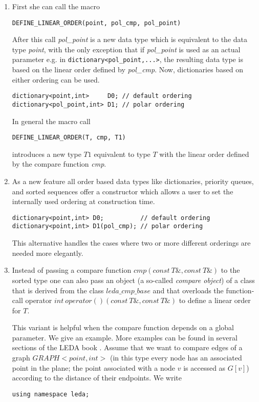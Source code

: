 \begin{enumerate}
\item First she can call the macro 
\begin{verbatim}
DEFINE_LINEAR_ORDER(point, pol_cmp, pol_point)
\end{verbatim}
After this call {\it pol\_point} is a new data type which is equivalent to the
data type {\it point}, with the only exception that if {\it pol\_point} is used
as an actual parameter e.g. in \texttt{dictionary<pol\_point,...>}, the
resulting data type is based on the linear order defined by {\it pol\_cmp}.
Now, dictionaries based on either ordering can be used.

\begin{verbatim}
dictionary<point,int>     D0; // default ordering
dictionary<pol_point,int> D1; // polar ordering
\end{verbatim}

In general the macro call
\begin{verbatim}
DEFINE_LINEAR_ORDER(T, cmp, T1)  
\end{verbatim}
introduces a new type $T1$ equivalent to type $T$ with the linear order defined
by the compare function {\it cmp}.

\item
As a new feature all order based data types like dictionaries, priority queues,
and sorted sequences offer a constructor which allows a user to set the
internally used ordering at construction time.
\begin{verbatim}
dictionary<point,int> D0;          // default ordering
dictionary<point,int> D1(pol_cmp); // polar ordering
\end{verbatim}
This alternative handles the cases where two or more different orderings
are needed more elegantly. 


\item Instead of passing a compare function 
$\mathit{cmp}(\mathit{const}\ T\&, \mathit{const}\ T\&)$ 
to the sorted type one can also pass an object (a so-called \emph{compare
object}) of a class that is derived from the class
$\mathit{leda{\_}cmp{\_}base}$ and that overloads the function-call operator
$\mathit{int}\ \mathit{operator}()(\mathit{const}\ T\&, \mathit{const}\ T\&)$
to define a linear order for $T$.

This variant is helpful when the compare function depends on a global
parameter. We give an example. More examples can be found in several sections
of the LEDA book \cite{LEDAbook}.  Assume that we want to compare edges of a
graph $\mathit{GRAPH}<\mathit{point},\mathit{int}>$ (in this type every node
has an associated point in the plane; the point associated with a node $v$ is
accessed as $G[v]$) according to the distance of their endpoints. We write
\begin{verbatim}
using namespace leda;


\end{verbatim}
\end{enumerate}
